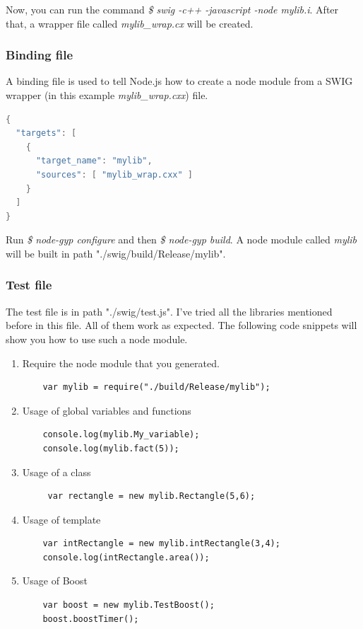Now, you can run the command \textit{\$ swig -c++ -javascript -node mylib.i}. After that, a wrapper file called \textit{mylib\_wrap.cx} will be created.


\subsubsection{Binding file}
A binding file is used to tell Node.js how to create a node module from a SWIG wrapper (in this example \textit{mylib\_wrap.cxx}) file.

 \begin{lstlisting}[language=c, caption= SWAG interface file]
{
  "targets": [
    {
      "target_name": "mylib",
      "sources": [ "mylib_wrap.cxx" ]
    }
  ]
}

    \end{lstlisting}

Run \textit{\$ node-gyp configure} and then \textit{\$ node-gyp build}. A node module called \textit{mylib} will be built in path "./swig/build/Release/mylib".


\subsubsection{Test file}
The test file is in path "./swig/test.js". I've tried all the libraries mentioned before in this file. All of them work as expected. The following code snippets will show you how to use such a node module.
    \begin{enumerate}
        \item Require the node module that you generated.
        \begin{lstlisting}
    var mylib = require("./build/Release/mylib");
        \end{lstlisting}
        
        \item Usage of global variables and functions
        \begin{lstlisting}
    console.log(mylib.My_variable);
    console.log(mylib.fact(5));
        \end{lstlisting}
        
        \item Usage of a class
        \begin{lstlisting}
     var rectangle = new mylib.Rectangle(5,6);
        \end{lstlisting}
        
        \item Usage of template
        \begin{lstlisting}
    var intRectangle = new mylib.intRectangle(3,4);
    console.log(intRectangle.area());
        \end{lstlisting}
        
        \item Usage of Boost
        \begin{lstlisting}
    var boost = new mylib.TestBoost();
    boost.boostTimer();
        \end{lstlisting}        
    \end{enumerate}

